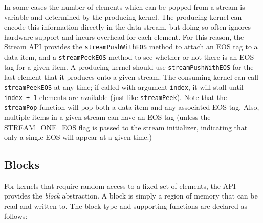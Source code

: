  In some cases the number of elements which can be
popped from a stream is variable and determined by the producing
kernel.  The producing kernel can encode this information directly in
the data stream, but doing so often ignores hardware support and
incurs overhead for each element.  For this reason, the Stream API
provides the {\tt streamPushWithEOS} method to attach an EOS tag to a
data item, and a {\tt streamPeekEOS} method to see whether or not
there is an EOS tag for a given item.  A producing kernel should use
{\tt streamPushWithEOS} for the last element that it produces onto a
given stream.  The consuming kernel can call {\tt streamPeekEOS} at
any time; if called with argument {\tt index}, it will stall until
{\tt index + 1} elements are available (just like {\tt streamPeek}).
Note that the {\tt streamPop} function will pop both a data item and
any associated EOS tag.  Also, multiple items in a given stream can
have an EOS tag (unless the STREAM\_ONE\_EOS flag is passed to the
stream initializer, indicating that only a single EOS will appear at a
given time.)



\subsection{Blocks}
\label{sec:blocks}

For kernels that require random access to a fixed set of elements, the
API provides the {\it block} abstraction.  A block is simply a region
of memory that can be read and written to.  The block type and
supporting functions are declared as follows:

